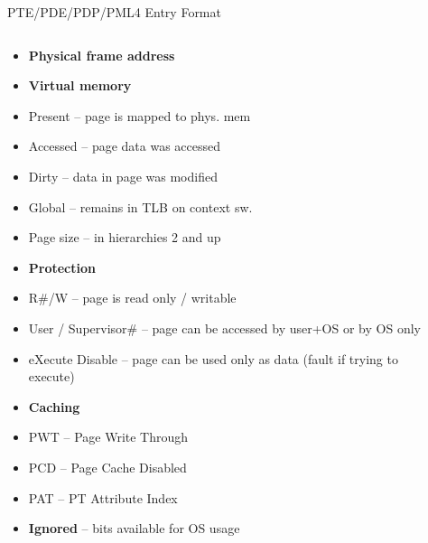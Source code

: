\documentclass[aspectratio=169,12pt]{beamer}
\renewcommand{\arraystretch}{1.2}
\begin{document}
\begin{frame}{PTE/PDE/PDP/PML4 Entry Format}


\begin{columns}[T]
\begin{column}{0.25\textwidth}
\vspace{-0.5em}
\tiny
\begin{itemize}\setlength{\itemsep}{0.1em}
\item \textbf{Physical frame address}
\item \textbf{Virtual memory}
  \item[] Present -- page is mapped to phys. mem
  \item[] Accessed -- page data was accessed  
  \item[] Dirty -- data in page was modified
  \item[] Global -- remains in TLB on context sw.
  \item[] Page size -- in hierarchies 2 and up
\item \textbf{Protection}
  \item[] R\#/W -- page is read only / writable
  \item[] User / Supervisor\# -- page can be accessed by user+OS or by OS only
  \item[] eXecute Disable -- page can be used only as data (fault if trying to execute)
\item \textbf{Caching}
  \item[] PWT -- Page Write Through
  \item[] PCD -- Page Cache Disabled
  \item[] PAT -- PT Attribute Index
\item \textbf{Ignored} -- bits available for OS usage
\end{itemize}
\end{column}
\begin{column}{0.75\textwidth}
\vspace{-1em}
\setlength{\tabcolsep}{0pt}
\setlength{\fboxsep}{0pt}
\renewcommand{\arraystretch}{1.3}

\end{column}
\end{columns}
\end{frame}
\end{document}
